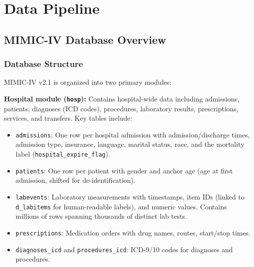 \documentclass[11pt,a4paper]{report}
\begin{document}
\part{Data Pipeline}

\chapter{MIMIC-IV Database Overview}

\section{Database Structure}

MIMIC-IV v2.1 is organized into two primary modules:

\textbf{Hospital module (\texttt{hosp}):} Contains hospital-wide data including admissions, patients, diagnoses (ICD codes), procedures, laboratory results, prescriptions, services, and transfers. Key tables include:
\begin{itemize}[leftmargin=2em]
\item \texttt{admissions}: One row per hospital admission with admission/discharge times, admission type, insurance, language, marital status, race, and the mortality label (\texttt{hospital\_expire\_flag}).
\item \texttt{patients}: One row per patient with gender and anchor age (age at first admission, shifted for de-identification).
\item \texttt{labevents}: Laboratory measurements with timestamps, item IDs (linked to \texttt{d\_labitems} for human-readable labels), and numeric values. Contains millions of rows spanning thousands of distinct lab tests.
\item \texttt{prescriptions}: Medication orders with drug names, routes, start/stop times.
\item \texttt{diagnoses\_icd} and \texttt{procedures\_icd}: ICD-9/10 codes for diagnoses and procedures.
\end{itemize}
\end{document}
